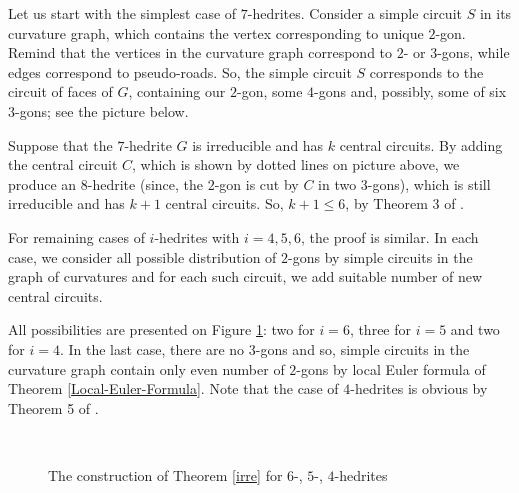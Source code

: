 \documentclass[12pt]{article}
\begin{document}
Let us start with the simplest case of $7$-hedrites. Consider a simple circuit $S$ in its curvature graph, which contains the vertex corresponding to unique $2$-gon. Remind that the vertices in the curvature graph correspond to $2$- or $3$-gons, while edges correspond to pseudo-roads. So, the simple circuit $S$ corresponds to the circuit of faces of $G$, containing our $2$-gon, some $4$-gons and, possibly, some of six $3$-gons; see the picture below.


\begin{center}
\epsfxsize=40mm
\end{center}






Suppose that the $7$-hedrite $G$ is irreducible and has $k$ central circuits. By adding the central circuit $C$, which is shown by dotted lines on picture above, we produce an $8$-hedrite (since, the $2$-gon is cut by $C$ in two $3$-gons), which is still irreducible and has $k+1$ central circuits. So, $k+1\leq 6$, by Theorem 3 of \cite{DSt}.


For remaining cases of $i$-hedrites with $i=4,5,6$, the proof is similar. In each case, we consider all possible distribution of $2$-gons by simple circuits in the graph of curvatures and for each such circuit, we add suitable number of new central circuits.


All possibilities are presented on Figure \ref{The456hedriteCases}:
two for $i=6$, three for $i=5$ and two for $i=4$. In the last case, there
are no $3$-gons and so, simple circuits in the curvature graph contain
only even number of $2$-gons by local Euler formula of Theorem 
\ref{Local-Euler-Formula}. Note that the case of $4$-hedrites is
obvious by Theorem 5 of \cite{DSt}.



\begin{figure}
\centering
\mbox{\quad
{}\quad
{}}
\caption{The construction of Theorem \ref{irre} for $6$-, $5$-, $4$-hedrites}
\label{The456hedriteCases}
\end{figure}
\end{document}
